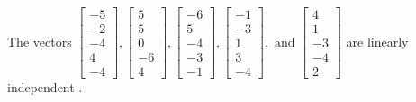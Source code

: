 \begin{exercise}
\begin{exerciseStatement}
  \end{exerciseStatement}
  \begin{exerciseAnswer}
   The vectors \(\left[\begin{array}{r}
-5 \\
-2 \\
-4 \\
4 \\
-4
\end{array}\right] , \left[\begin{array}{r}
5 \\
5 \\
0 \\
-6 \\
4
\end{array}\right] , \left[\begin{array}{r}
-6 \\
5 \\
-4 \\
-3 \\
-1
\end{array}\right] , \left[\begin{array}{r}
-1 \\
-3 \\
1 \\
3 \\
-4
\end{array}\right] , \text{ and } \left[\begin{array}{r}
4 \\
1 \\
-3 \\
-4 \\
2
\end{array}\right]\) are 
  	 linearly independent  .
  


  \end{exerciseAnswer}
\end{exercise}